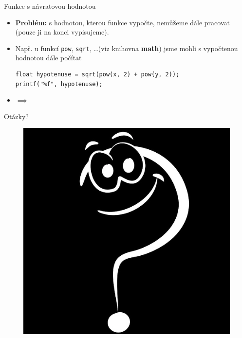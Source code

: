 \documentclass[14pt,aspectratio=169]{beamer}
\begin{document}
    \begin{frame}[t,fragile]{Funkce s návratovou hodnotou}
        \begin{itemize}
            \item \textbf{Problém:} s hodnotou, kterou funkce vypočte, nemůžeme dále pracovat (pouze ji na konci vypisujeme).
            \item Např. u funkcí \texttt{pow}, \texttt{sqrt}, \dots (viz knihovna \textbf{math}) jsme mohli s vypočtenou hodnotou dále počítat
            \begin{lstlisting}
float hypotenuse = sqrt(pow(x, 2) + pow(y, 2));
printf("%f", hypotenuse);
            \end{lstlisting}
            \item $\implies$ 
        \end{itemize}
    \end{frame}

    \begin{frame}{Otázky?}
        \begin{figure}
            \centering
            \includegraphics[scale=.4]{images/discussion_inverted.png}
        \end{figure}
    \end{frame}
\end{document}
